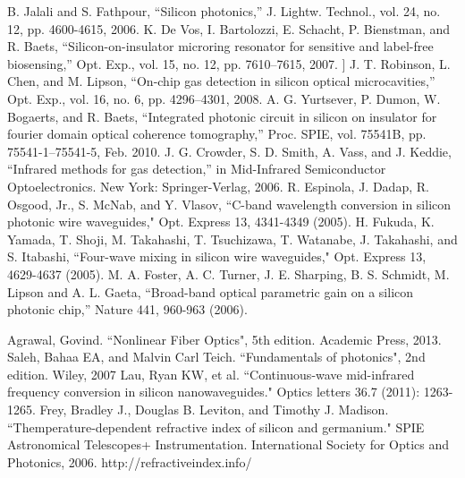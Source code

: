 \documentclass[12pt,a4paper,twoside]{article}
\begin{document}
\clearpage
\begin{thebibliography}{9}
 B. Jalali and S. Fathpour, “Silicon photonics,” J. Lightw. Technol., vol. 24, no. 12, pp. 4600-4615, 2006.
 K. De Vos, I. Bartolozzi, E. Schacht, P. Bienstman, and R. Baets, “Silicon-on-insulator microring resonator for sensitive and label-free biosensing,” Opt. Exp., vol. 15, no. 12, pp. 7610–7615, 2007.
 ] J. T. Robinson, L. Chen, and M. Lipson, “On-chip gas detection in silicon optical microcavities,” Opt. Exp., vol. 16, no. 6, pp. 4296–4301, 2008.
 A. G. Yurtsever, P. Dumon, W. Bogaerts, and R. Baets, “Integrated photonic circuit in silicon on insulator for fourier domain optical coherence tomography,” Proc. SPIE, vol. 75541B, pp. 75541-1–75541-5, Feb. 2010.
 J. G. Crowder, S. D. Smith, A. Vass, and J. Keddie, “Infrared methods for gas detection,” in Mid-Infrared Semiconductor Optoelectronics. New York: Springer-Verlag, 2006.
 R. Espinola, J. Dadap, R. Osgood, Jr., S. McNab, and Y. Vlasov, “C-band wavelength conversion in silicon photonic wire waveguides," Opt. Express 13, 4341-4349 (2005).
 H. Fukuda, K. Yamada, T. Shoji, M. Takahashi, T. Tsuchizawa, T. Watanabe, J. Takahashi, and S. Itabashi, “Four-wave mixing in silicon wire waveguides," Opt. Express 13, 4629-4637 (2005).
 M. A. Foster, A. C. Turner, J. E. Sharping, B. S. Schmidt, M. Lipson and A. L. Gaeta, “Broad-band optical parametric gain on a silicon photonic chip,” Nature 441, 960-963 (2006).

 Agrawal, Govind. “Nonlinear Fiber Optics", 5th edition. Academic Press, 2013.
 Saleh, Bahaa EA, and Malvin Carl Teich. “Fundamentals of photonics", 2nd edition. Wiley, 2007
 Lau, Ryan KW, et al. “Continuous-wave mid-infrared frequency conversion in silicon nanowaveguides." Optics letters 36.7 (2011): 1263-1265.
	Frey, Bradley J., Douglas B. Leviton, and Timothy J. Madison. “Themperature-dependent refractive index of silicon and germanium." SPIE Astronomical Telescopes+ Instrumentation. International Society for Optics and Photonics, 2006.
 http://refractiveindex.info/


\end{thebibliography}
\end{document}
